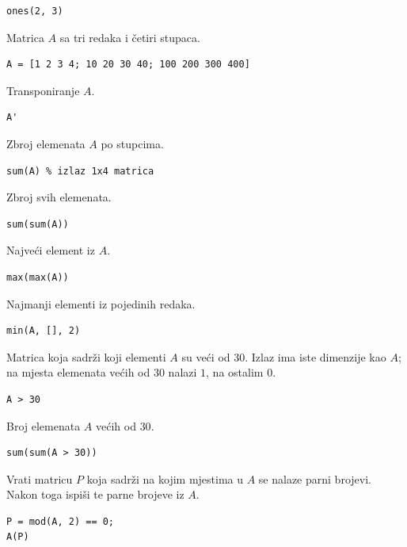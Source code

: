 \documentclass[a4paper, 10pt]{article}
\begin{document}
\begin{lstlisting}
ones(2, 3)
\end{lstlisting}

Matrica $A$ sa tri redaka i četiri stupaca.

\begin{lstlisting}
A = [1 2 3 4; 10 20 30 40; 100 200 300 400]
\end{lstlisting}

Transponiranje $A$.

\begin{lstlisting}
A'
\end{lstlisting}

Zbroj elemenata $A$ po stupcima.

\begin{lstlisting}
sum(A) % izlaz 1x4 matrica
\end{lstlisting}

Zbroj svih elemenata.

\begin{lstlisting}
sum(sum(A))
\end{lstlisting}

Najveći element iz $A$.

\begin{lstlisting}
max(max(A))
\end{lstlisting}

Najmanji elementi iz pojedinih redaka.

\begin{lstlisting}
min(A, [], 2)
\end{lstlisting}

Matrica koja sadrži koji elementi $A$ su veći od $30$. Izlaz ima iste dimenzije kao $A$; na mjesta elemenata većih od $30$ nalazi $1$, na ostalim $0$.

\begin{lstlisting}
A > 30
\end{lstlisting}

Broj elemenata $A$ većih od $30$.

\begin{lstlisting}
sum(sum(A > 30))
\end{lstlisting}

Vrati matricu $P$ koja sadrži na kojim mjestima u $A$ se nalaze parni brojevi. Nakon toga ispiši te parne brojeve iz $A$.

\begin{lstlisting}
P = mod(A, 2) == 0;
A(P)
\end{lstlisting}
\end{document}
